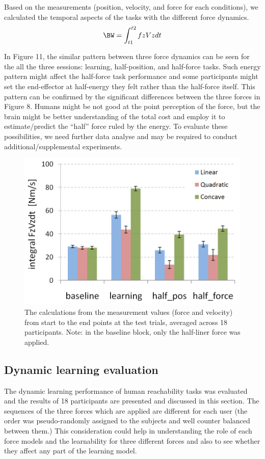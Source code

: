 Based on the measurements (position, velocity, and force for each conditions), we calculated the temporal aspects of the tasks with the different force dynamics.
%
\begin{equation}
  \BW = \int_{t1}^{t2} fz Vz dt
\end{equation}
%

In Figure 11, the similar pattern between three force dynamics can be seen for the all the three sessions: learning, half-position, and half-force tasks. Such energy pattern might affect the half-force task performance and some participants might set the end-effector at half-energy they felt rather than the half-force itself. This pattern can be confirmed by the significant differences between the three forces in Figure 8. Humans might be not good at the point perception of the force, but the brain might be better understanding of the total cost and employ it to estimate/predict the “half” force ruled by the energy. To evaluate these possibilities, we need further data analyse and may be required to conduct additional/supplemental experiments.
%
\begin{figure}
  \centering
  \includegraphics[scale=0.5]{Chie/figs/Figure11.png}
  \caption{The calculations from the measurement values (force and velocity) from start to the end points at the test trials, averaged across 18 participants.  Note: in the baseline block, only the half-liner force was applied.}
  \label{forcevel}
\end{figure}
\subsection{Dynamic learning evaluation}
The dynamic learning performance of human reachability tasks was evaluated and the results of 18 participants are presented and discussed in this section. The sequences of the three forces which are applied are different for each user (the order was pseudo-randomly assigned to the subjects and well counter balanced between them.) This consideration could help in understanding the role of each force models and the learnability for three different forces and also to see whether they affect any part of the learning model.

